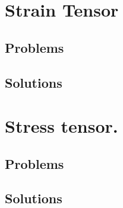 %
%
%
   


   \chapter{Strain Tensor}
      
      
      
      
      
      
      \section{Problems}
         
      \section{Solutions}
         \shipoutAnswer

   \chapter{Stress tensor.}
      
      
      
      
      
      
      
      
      \section{Problems}
         
      \section{Solutions}
         \shipoutAnswer

